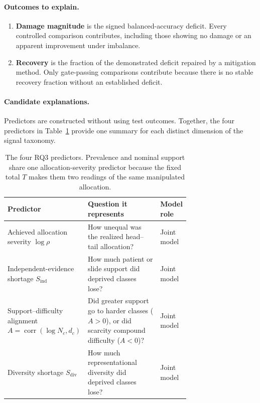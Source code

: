 \documentclass[11pt]{article}
\begin{document}
\paragraph{Outcomes to explain.}
\begin{enumerate}
  \item \textbf{Damage magnitude} is the signed balanced-accuracy deficit. Every controlled comparison contributes, including those showing no damage or an apparent improvement under imbalance.
  \item \textbf{Recovery} is the fraction of the demonstrated deficit repaired by a mitigation method. Only gate-passing comparisons contribute because there is no stable recovery fraction without an established deficit.
\end{enumerate}

\paragraph{Candidate explanations.}
Predictors are constructed without using test outcomes. Together, the four predictors in Table~\ref{tab:rq3-predictors} provide one summary for each distinct dimension of the signal taxonomy.

\begin{table}[ht]
  \centering
  \footnotesize
  \begin{tabularx}{\linewidth}{@{}>{\raggedright\arraybackslash}p{0.23\linewidth}>{\raggedright\arraybackslash}p{0.49\linewidth}X@{}}
    \toprule
    Predictor & Question it represents & Model role \\
    \midrule
    Achieved allocation severity $\log\rho$ & How unequal was the realized head--tail allocation? & Joint model \\
    Independent-evidence shortage $S_{\mathrm{ind}}$ & How much patient or slide support did deprived classes lose? & Joint model \\
    Support--difficulty alignment $A=\operatorname{corr}(\log N_c,d_c)$ & Did greater support go to harder classes ($A>0$), or did scarcity compound difficulty ($A<0$)? & Joint model \\
    Diversity shortage $S_{\mathrm{div}}$ & How much representational diversity did deprived classes lose? & Joint model \\
    \bottomrule
  \end{tabularx}
  \caption{The four RQ3 predictors. Prevalence and nominal support share one allocation-severity predictor because the fixed total $T$ makes them two readings of the same manipulated allocation.}
  \label{tab:rq3-predictors}
\end{table}
\end{document}
